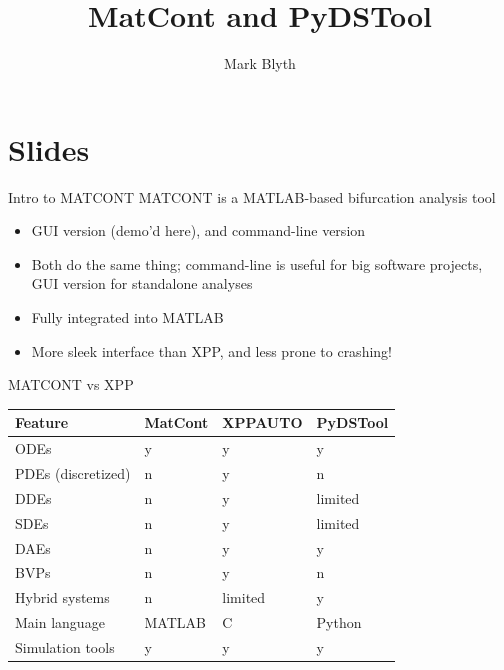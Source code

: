 \documentclass[presentation]{beamer}
\author{Mark Blyth}
\date{}
\title{MatCont and PyDSTool}
\begin{document}
\maketitle


\section{Slides}
\label{sec:orgcee6a65}
\begin{frame}[label={sec:org6d22fe2}]{Intro to MATCONT}
MATCONT is a MATLAB-based bifurcation analysis tool
\vfill
\begin{itemize}
\item GUI version (demo'd here), and command-line version
\end{itemize}
\vfill
\begin{itemize}
\item Both do the same thing; command-line is useful for big software projects, GUI version for standalone analyses
\end{itemize}
\vfill
\begin{itemize}
\item Fully integrated into MATLAB
\end{itemize}
\vfill
\begin{itemize}
\item More sleek interface than XPP, and less prone to crashing!
\end{itemize}
\end{frame}

\begin{frame}[label={sec:orge2f36b7}]{MATCONT vs XPP}
\begin{center}
\begin{tabular}{llll}
\hline
Feature & MatCont & XPPAUTO & PyDSTool\\
\hline
ODEs & y & y & y\\
PDEs (discretized) & n & y & n\\
DDEs & n & y & limited\\
SDEs & n & y & limited\\
DAEs & n & y & y\\
BVPs & n & y & n\\
Hybrid systems & n & limited & y\\
Main language & MATLAB & C & Python\\
Simulation tools & y & y & y\\
\hline
\end{tabular}
\end{center}
\end{frame}
\end{document}
